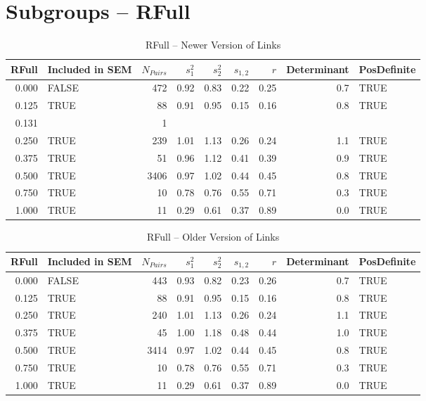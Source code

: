 \documentclass{article}\usepackage{graphicx, color}
\begin{document}
\section{Subgroups --  RFull }%
\begin{table}[ht]
\centering
\begin{tabular}{rlrrrrrrl}
  \hline
RFull & Included in SEM & $N_{Pairs}$ & $s_1^2$ & $s_2^2$ & $s_{1,2}$ & $r$ & Determinant & PosDefinite \\ 
  \hline
0.000 & FALSE & 472 & 0.92 & 0.83 & 0.22 & 0.25 & 0.7 & TRUE \\ 
  0.125 & TRUE & 88 & 0.91 & 0.95 & 0.15 & 0.16 & 0.8 & TRUE \\ 
  0.131 &  & 1 &  &  &  &  &  &  \\ 
  0.250 & TRUE & 239 & 1.01 & 1.13 & 0.26 & 0.24 & 1.1 & TRUE \\ 
  0.375 & TRUE & 51 & 0.96 & 1.12 & 0.41 & 0.39 & 0.9 & TRUE \\ 
  0.500 & TRUE & 3406 & 0.97 & 1.02 & 0.44 & 0.45 & 0.8 & TRUE \\ 
  0.750 & TRUE & 10 & 0.78 & 0.76 & 0.55 & 0.71 & 0.3 & TRUE \\ 
  1.000 & TRUE & 11 & 0.29 & 0.61 & 0.37 & 0.89 & 0.0 & TRUE \\ 
   \hline
\end{tabular}
\caption{RFull -- Newer Version of Links} 
\end{table}
\begin{table}[ht]
\centering
\begin{tabular}{rlrrrrrrl}
  \hline
RFull & Included in SEM & $N_{Pairs}$ & $s_1^2$ & $s_2^2$ & $s_{1,2}$ & $r$ & Determinant & PosDefinite \\ 
  \hline
0.000 & FALSE & 443 & 0.93 & 0.82 & 0.23 & 0.26 & 0.7 & TRUE \\ 
  0.125 & TRUE & 88 & 0.91 & 0.95 & 0.15 & 0.16 & 0.8 & TRUE \\ 
  0.250 & TRUE & 240 & 1.01 & 1.13 & 0.26 & 0.24 & 1.1 & TRUE \\ 
  0.375 & TRUE & 45 & 1.00 & 1.18 & 0.48 & 0.44 & 1.0 & TRUE \\ 
  0.500 & TRUE & 3414 & 0.97 & 1.02 & 0.44 & 0.45 & 0.8 & TRUE \\ 
  0.750 & TRUE & 10 & 0.78 & 0.76 & 0.55 & 0.71 & 0.3 & TRUE \\ 
  1.000 & TRUE & 11 & 0.29 & 0.61 & 0.37 & 0.89 & 0.0 & TRUE \\ 
   \hline
\end{tabular}
\caption{RFull -- Older Version of Links} 
\end{table}
\end{document}
